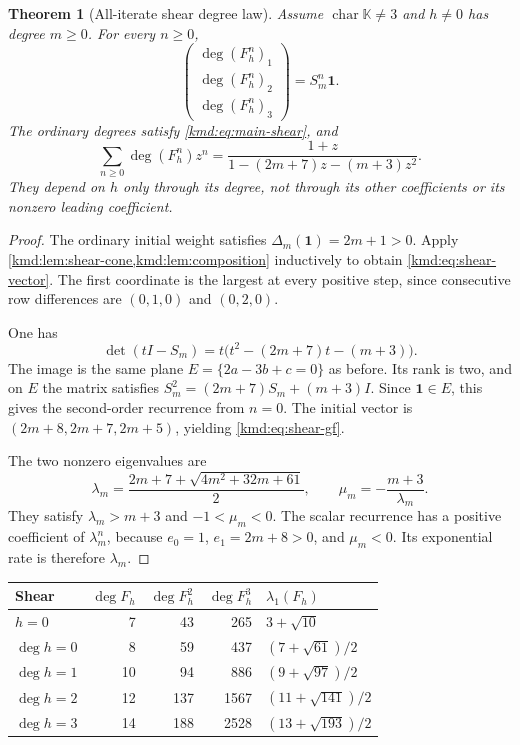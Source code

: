 \documentclass[11pt,a4paper]{article}
\numberwithin{equation}{section}
\newtheorem{theorem}{Theorem}[section]
\theoremstyle{definition}
\theoremstyle{remark}
\newcommand{\K}{\mathbb K}
\newcommand{\one}{\mathbf 1}
\newcommand{\dd}{\operatorname{deg}}
\DeclareMathOperator{\charac}{char}
\begin{document}
\begin{theorem}[All-iterate shear degree law]\label{kmd:thm:shears}
Assume $\charac\K\ne3$ and $h\ne0$ has degree $m\ge0$. For every
$n\ge0$,
\begin{equation}
 \begin{pmatrix}\dd(F_h^n)_1\\\dd(F_h^n)_2\\\dd(F_h^n)_3\end{pmatrix}
 =S_m^n\one.
 \label{kmd:eq:shear-vector}
\end{equation}
The ordinary degrees satisfy \eqref{kmd:eq:main-shear}, and
\begin{equation}
 \sum_{n\ge0}\dd(F_h^n)z^n
 =\frac{1+z}{1-(2m+7)z-(m+3)z^2}.
 \label{kmd:eq:shear-gf}
\end{equation}
They depend on $h$ only through its degree, not through its other
coefficients or its nonzero leading coefficient.
\end{theorem}
\begin{proof}
The ordinary initial weight satisfies $\Delta_m(\one)=2m+1>0$.
Apply \cref{kmd:lem:shear-cone,kmd:lem:composition} inductively to obtain
\eqref{kmd:eq:shear-vector}. The first coordinate is the largest at
every positive step, since consecutive row differences are
$(0,1,0)$ and $(0,2,0)$.

One has
\[
 \det(tI-S_m)=t\bigl(t^2-(2m+7)t-(m+3)\bigr).
\]
The image is the same plane $E=\{2a-3b+c=0\}$ as before. Its rank
is two, and on $E$ the matrix satisfies
$S_m^2=(2m+7)S_m+(m+3)I$. Since $\one\in E$, this gives the
second-order recurrence from $n=0$. The initial vector is
$(2m+8,2m+7,2m+5)$, yielding \eqref{kmd:eq:shear-gf}.

The two nonzero eigenvalues are
\[
 \lambda_m=\frac{2m+7+\sqrt{4m^2+32m+61}}2,
 \qquad \mu_m=-\frac{m+3}{\lambda_m}.
\]
They satisfy $\lambda_m>m+3$ and $-1<\mu_m<0$. The scalar
recurrence has a positive coefficient of $\lambda_m^n$, because
$e_0=1$, $e_1=2m+8>0$, and $\mu_m<0$. Its exponential rate is
therefore $\lambda_m$.
\end{proof}

\begin{center}
\small
\begin{tabular}{@{}lrrrl@{}}
\toprule
Shear & $\dd F_h$ & $\dd F_h^2$ & $\dd F_h^3$ & $\lambda_1(F_h)$\\
\midrule
$h=0$ &7&43&265&$3+\sqrt{10}$\\
$\dd h=0$ &8&59&437&$(7+\sqrt{61})/2$\\
$\dd h=1$ &10&94&886&$(9+\sqrt{97})/2$\\
$\dd h=2$ &12&137&1567&$(11+\sqrt{141})/2$\\
$\dd h=3$ &14&188&2528&$(13+\sqrt{193})/2$\\
\bottomrule
\end{tabular}
\end{center}
\end{document}
